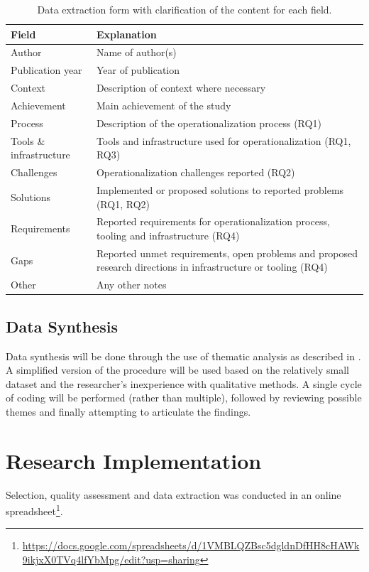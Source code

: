 \begin{table}[]
    \centering
    \begin{tabular}{l|p{8.5cm}}
        Field & Explanation\\
        \hline
        Author & Name of author(s)  \\
        Publication year & Year of publication \\
        Context & Description of context where necessary \\
        Achievement & Main achievement of the study \\
        Process & Description of the operationalization process (RQ1) \\
        Tools \& infrastructure & Tools and infrastructure used for operationalization (RQ1, RQ3) \\
        Challenges & Operationalization challenges reported (RQ2) \\
        Solutions & Implemented or proposed solutions to reported problems (RQ1, RQ2) \\
        Requirements & Reported requirements for operationalization process, tooling and infrastructure (RQ4) \\
        Gaps & Reported unmet requirements, open problems and proposed research directions in infrastructure or tooling  (RQ4) \\
        Other & Any other notes \\
    \end{tabular}
    \caption{Data extraction form with clarification of the content for each field.}
    \label{tab:data_extraction_form}
\end{table}

\subsection{Data Synthesis}
\label{sec:data_synthesis_method}
Data synthesis will be done through the use of thematic analysis as described in \cite{Lochmiller2021}.
A simplified version of the procedure will be used based on the relatively small dataset and the researcher's inexperience with qualitative methods.
A single cycle of coding will be performed (rather than multiple), followed by reviewing possible themes and finally attempting to articulate the findings.

\section{Research Implementation}
\label{sec:research_implementation}
Selection, quality assessment and data extraction was conducted in an online spreadsheet\footnote{\url{https://docs.google.com/spreadsheets/d/1VMBLQZBsc5dgldnDfHH8cHAWk9ikjxX0TVq4lfYbMpg/edit?usp=sharing}}.


